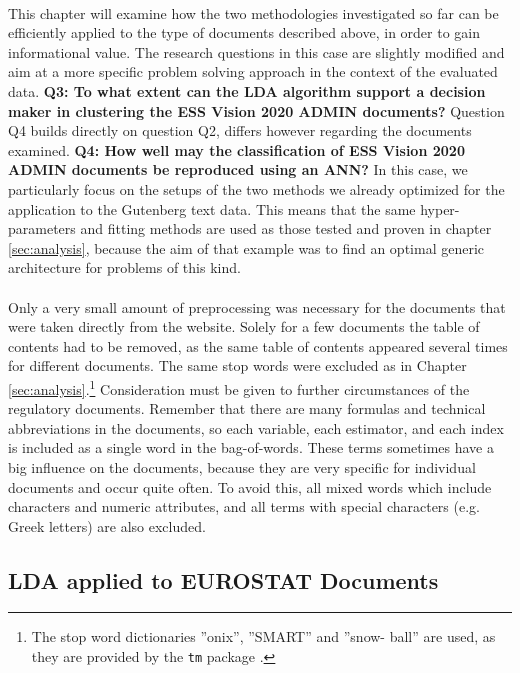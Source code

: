 \documentclass[11pt,a4paper]{article}
\begin{document}
\ \\
This chapter will examine how the two methodologies investigated so far can be efficiently applied to the type of documents described above, in order to gain informational value. The research questions in this case are slightly modified and aim at a more specific problem solving approach in the context of the evaluated data. \textbf{Q3: To what extent can the LDA algorithm support a decision maker in clustering the ESS Vision 2020 ADMIN documents?} Question Q4 builds directly on question Q2, differs however regarding the documents examined. \textbf{Q4: How well may the classification of ESS Vision 2020 ADMIN documents be reproduced using an ANN?} In this case, we particularly focus on the setups of the two methods we already optimized for the application to the Gutenberg text data. This means that the same hyper-parameters and fitting methods are used as those tested and proven in chapter \ref{sec:analysis}, because the aim of that example was to find an optimal generic architecture for problems of this kind.\\
\ \\
Only a very small amount of preprocessing was necessary for the documents that were taken directly from the website. Solely for a few documents the table of contents had to be removed, as the same table of contents appeared several times for different documents. The same stop words were excluded as in Chapter \ref{sec:analysis}.\footnote{The stop word dictionaries ”onix”, ”SMART” and ”snow- ball” are used, as they are provided by the \texttt{tm} package \cite{Silge2017}.} Consideration must be given to further circumstances of the regulatory documents. Remember that there are many formulas and technical abbreviations in the documents, so each variable, each estimator, and each index is included as a single word in the bag-of-words. These terms sometimes have a big influence on the documents, because they are very specific for individual documents and occur quite often. To avoid this, all mixed words which include characters and numeric attributes, and all terms with special characters (e.g. Greek letters) are also excluded.

\subsection{LDA applied to EUROSTAT Documents} \label{Example2}
\end{document}
